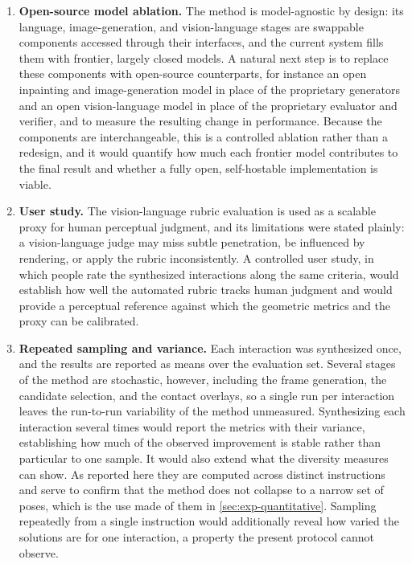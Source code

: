 \begin{enumerate}
  \item \textbf{Open-source model ablation.} The method is model-agnostic by design: its language, image-generation, and vision-language stages are swappable components accessed through their interfaces, and the current system fills them with frontier, largely closed models. A natural next step is to replace these components with open-source counterparts, for instance an open inpainting and image-generation model in place of the proprietary generators and an open vision-language model in place of the proprietary evaluator and verifier, and to measure the resulting change in performance. Because the components are interchangeable, this is a controlled ablation rather than a redesign, and it would quantify how much each frontier model contributes to the final result and whether a fully open, self-hostable implementation is viable.

  \item \textbf{User study.} The vision-language rubric evaluation is used as a scalable proxy for human perceptual judgment, and its limitations were stated plainly: a vision-language judge may miss subtle penetration, be influenced by rendering, or apply the rubric inconsistently. A controlled user study, in which people rate the synthesized interactions along the same criteria, would establish how well the automated rubric tracks human judgment and would provide a perceptual reference against which the geometric metrics and the proxy can be calibrated.

  \item \textbf{Repeated sampling and variance.} Each interaction was synthesized once, and the results are reported as means over the evaluation set. Several stages of the method are stochastic, however, including the frame generation, the candidate selection, and the contact overlays, so a single run per interaction leaves the run-to-run variability of the method unmeasured. Synthesizing each interaction several times would report the metrics with their variance, establishing how much of the observed improvement is stable rather than particular to one sample. It would also extend what the diversity measures can show. As reported here they are computed across distinct instructions and serve to confirm that the method does not collapse to a narrow set of poses, which is the use made of them in \cref{sec:exp-quantitative}. Sampling repeatedly from a single instruction would additionally reveal how varied the solutions are for one interaction, a property the present protocol cannot observe.
  

\end{enumerate}

